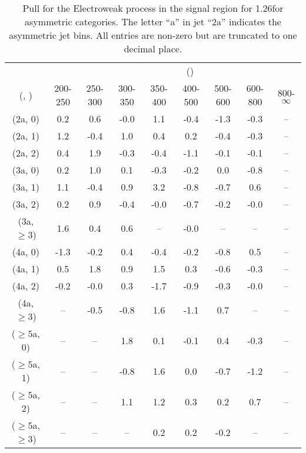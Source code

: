 \begin{table}[h!]
\tiny
\centering
\caption{Pull for the Electroweak process in the signal region for 1.26\ifb for asymmetric categories. The letter ``a'' in jet \eg ``2a''  indicates the asymmetric jet bins. All entries are non-zero but are truncated to one decimal place.\label{tab:pullsep_sig_ewk_asym}}
\begin{tabular}
{ccccccccc}
	\hline\hline
&	& \multicolumn{8}{c}{\scalht (\gev)} \\ 
	 (\njet,  \nb) & 200-250 & 250-300 & 300-350 & 350-400 & 400-500 & 500-600 & 600-800 & 800-$\infty$ \\ [0.8ex] 
\hline
	(2a, 0) & 0.2 & 0.6 & -0.0 & 1.1 & -0.4 & -1.3 & -0.3 & -- \\[0.5ex] 
	(2a, 1) & 1.2 & -0.4 & 1.0 & 0.4 & 0.2 & -0.4 & -0.3 & -- \\[0.5ex] 
	(2a, 2) & 0.4 & 1.9 & -0.3 & -0.4 & -1.1 & -0.1 & -0.1 & -- \\[0.5ex] 
	(3a, 0) & 0.2 & 1.0 & 0.1 & -0.3 & -0.2 & 0.0 & -0.8 & -- \\[0.5ex] 
	(3a, 1) & 1.1 & -0.4 & 0.9 & 3.2 & -0.8 & -0.7 & 0.6 & -- \\[0.5ex] 
	(3a, 2) & 0.2 & 0.9 & -0.4 & -0.0 & -0.7 & -0.2 & -0.0 & -- \\[0.5ex] 
	(3a, $\ge3$) & 1.6 & 0.4 & 0.6 & -- & -0.0 & -- & -- & -- \\[0.5ex] 
	(4a, 0) & -1.3 & -0.2 & 0.4 & -0.4 & -0.2 & -0.8 & 0.5 & -- \\[0.5ex] 
	(4a, 1) & 0.5 & 1.8 & 0.9 & 1.5 & 0.3 & -0.6 & -0.3 & -- \\[0.5ex] 
	(4a, 2) & -0.2 & -0.0 & 0.3 & -1.7 & -0.9 & -0.3 & -0.0 & -- \\[0.5ex] 
	(4a, $\ge3$) & -- & -0.5 & -0.8 & 1.6 & -1.1 & 0.7 & -- & -- \\[0.5ex] 
	($\ge5$a, 0) & -- & -- & 1.8 & 0.1 & -0.1 & 0.4 & -0.3 & -- \\[0.5ex] 
	($\ge5$a, 1) & -- & -- & -0.8 & 1.6 & 0.0 & -0.7 & -1.2 & -- \\[0.5ex] 
	($\ge5$a, 2) & -- & -- & 1.1 & 1.2 & 0.3 & 0.2 & 0.7 & -- \\[0.5ex] 
	($\ge5$a, $\ge3$) & -- & -- & -- & 0.2 & 0.2 & -0.2 & -- & -- \\[0.5ex] 
	\hline
	\hline
\end{tabular}
\end{table}
